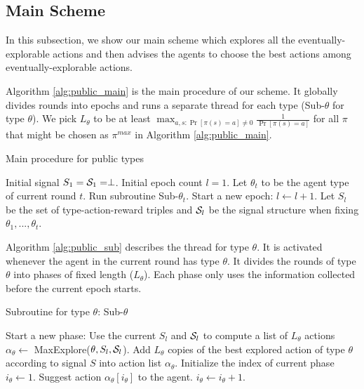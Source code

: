 \subsection{Main Scheme}
\label{sec:public_main}
In this subsection, we show our main scheme which explores all the eventually-explorable actions and then advises the agents to choose the best actions among eventually-explorable actions.

Algorithm \ref{alg:public_main} is the main procedure of our scheme. It globally divides rounds into epochs and runs a separate thread for each type (Sub-$\theta$ for type $\theta$). We pick $L_{\theta}$ to be at least $\max_{a,s: \Pr[\pi(s)=a] \neq 0} \frac{1}{\Pr[\pi(s)=a]}$ for all $\pi$ that might be chosen as $\pi^{max}$ in Algorithm \ref{alg:public_main}.
 \begin{algorithm}[H]
    \caption{Main procedure for public types }
    	\label{alg:public_main}
    \begin{algorithmic}[1]
    	\STATE Initial signal $S_1 = \S_1 = \perp$.
	\STATE Initial epoch count $l = 1$.
		\STATE Let $\theta_t$ to be the agent type of current round $t$. Run subroutine Sub-$\theta_t$.
			\STATE Start a new epoch:
			\STATE $l \leftarrow l + 1$.
			\STATE Let $S_l$ be the set of type-action-reward triples and $\S_l$ be the signal structure when fixing $\theta_1,...,\theta_t$.
		\ENDIF
	\ENDFOR
     \end{algorithmic}
\end{algorithm}

Algorithm \ref{alg:public_sub} describes the thread for type $\theta$. It is activated whenever the agent in the current round has type $\theta$. It divides the rounds of type $\theta$ into phases of fixed length ($L_{\theta}$). Each phase only uses the information collected before the current epoch starts.

 \begin{algorithm}[H]
    \caption{Subroutine for type $\theta$: Sub-$\theta$ }
    	\label{alg:public_sub}
    \begin{algorithmic}[1]
			\STATE Start a new phase:
				\STATE Use the current $S_l$ and $\S_l$ to compute a list of $L_{\theta}$ actions $\alpha_{\theta} \leftarrow $ MaxExplore($\theta, S_l, \S_l$).
			\ELSE
				\STATE Add $L_{\theta}$ copies of the best explored action of type $\theta$ according to signal $S$ into action list $\alpha_{\theta}$.
			\ENDIF
			\STATE Initialize the index of current phase $i_{\theta} \leftarrow 1$.
		\ENDIF
		\STATE Suggest action $\alpha_{\theta} [i_{\theta}]$ to the agent.
		\STATE $i_{\theta} \leftarrow i_{\theta} + 1$.
	\ENDFOR
     \end{algorithmic}
\end{algorithm}



